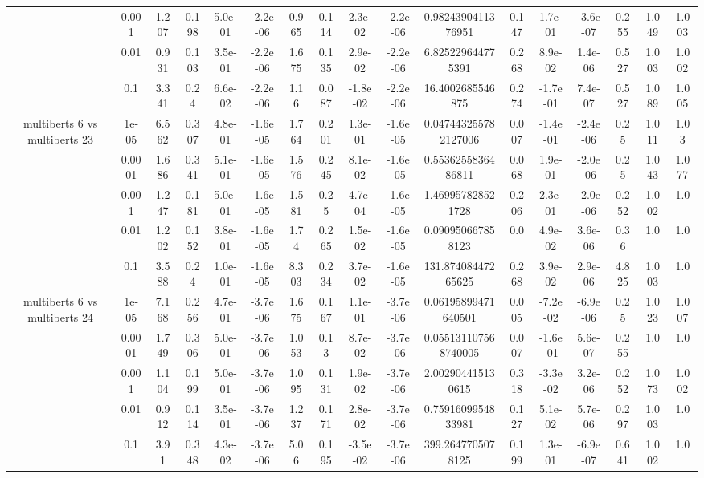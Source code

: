 \begin{tabular}{|c|c|c|c|c|c|c|c|c|c|c|c|c|c|c|c|c|}
 & 0.001 & 1.207 & 0.198 & 5.0e-01 & -2.2e-06 & 0.965 & 0.114 & 2.3e-02 & -2.2e-06 & 0.9824390411376951 & 0.147 & 1.7e-01 & -3.6e-07 & 0.255 & 1.049 & 1.003 \\
 & 0.01 & 0.931 & 0.103 & 3.5e-01 & -2.2e-06 & 1.675 & 0.135 & 2.9e-02 & -2.2e-06 & 6.825229644775391 & 0.268 & 8.9e-02 & 1.4e-06 & 0.527 & 1.003 & 1.002 \\
 & 0.1 & 3.341 & 0.24 & 6.6e-02 & -2.2e-06 & 1.16 & 0.087 & -1.8e-02 & -2.2e-06 & 16.4002685546875 & 0.274 & -1.7e-01 & 7.4e-07 & 0.527 & 1.089 & 1.005 \\
\hline
\multirow{5}{*}{multiberts 6 vs multiberts 23} & 1e-05 & 6.562 & 0.307 & 4.8e-01 & -1.6e-05 & 1.764 & 0.201 & 1.3e-01 & -1.6e-05 & 0.047443255782127006 & 0.007 & -1.4e-01 & -2.4e-06 & 0.25 & 1.011 & 1.03 \\
 & 0.0001 & 1.686 & 0.341 & 5.1e-01 & -1.6e-05 & 1.576 & 0.245 & 8.1e-02 & -1.6e-05 & 0.5536255836486811 & 0.068 & 1.9e-01 & -2.0e-06 & 0.25 & 1.043 & 1.077 \\
 & 0.001 & 1.247 & 0.181 & 5.0e-01 & -1.6e-05 & 1.581 & 0.25 & 4.7e-04 & -1.6e-05 & 1.469957828521728 & 0.206 & 2.3e-01 & -2.0e-06 & 0.252 & 1.002 & 1.0 \\
 & 0.01 & 1.202 & 0.152 & 3.8e-01 & -1.6e-05 & 1.74 & 0.265 & 1.5e-02 & -1.6e-05 & 0.090950667858123 & 0.0 & 4.9e-02 & 3.6e-06 & 0.36 & 1.0 & 1.0 \\
 & 0.1 & 3.588 & 0.24 & 1.0e-01 & -1.6e-05 & 8.303 & 0.234 & 3.7e-02 & -1.6e-05 & 131.87408447265625 & 0.268 & 3.9e-02 & 2.9e-06 & 4.825 & 1.003 & 1.0 \\
\hline
\multirow{5}{*}{multiberts 6 vs multiberts 24} & 1e-05 & 7.168 & 0.256 & 4.7e-01 & -3.7e-06 & 1.675 & 0.167 & 1.1e-01 & -3.7e-06 & 0.06195899471640501 & 0.005 & -7.2e-02 & -6.9e-06 & 0.25 & 1.023 & 1.007 \\
 & 0.0001 & 1.749 & 0.306 & 5.0e-01 & -3.7e-06 & 1.053 & 0.13 & 8.7e-02 & -3.7e-06 & 0.055131107568740005 & 0.007 & -1.6e-01 & 5.6e-07 & 0.255 & 1.0 & 1.0 \\
 & 0.001 & 1.104 & 0.199 & 5.0e-01 & -3.7e-06 & 1.095 & 0.131 & 1.9e-02 & -3.7e-06 & 2.002904415130615 & 0.318 & -3.3e-02 & 3.2e-06 & 0.252 & 1.073 & 1.002 \\
 & 0.01 & 0.912 & 0.114 & 3.5e-01 & -3.7e-06 & 1.237 & 0.171 & 2.8e-02 & -3.7e-06 & 0.7591609954833981 & 0.127 & 5.1e-02 & 5.7e-06 & 0.297 & 1.003 & 1.0 \\
 & 0.1 & 3.91 & 0.348 & 4.3e-02 & -3.7e-06 & 5.06 & 0.195 & -3.5e-02 & -3.7e-06 & 399.2647705078125 & 0.199 & 1.3e-01 & -6.9e-07 & 0.641 & 1.002 & 1.0 \\

\end{tabular}
